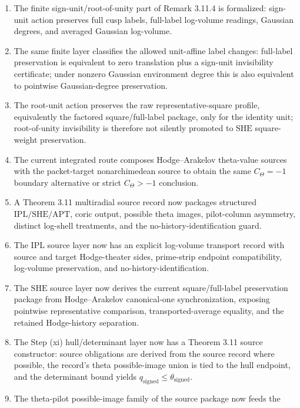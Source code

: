 \documentclass[11pt]{article}
\newcommand{\SHE}{\ensuremath{\mathrm{SHE}}}
\newcommand{\IPL}{\ensuremath{\mathrm{IPL}}}
\newcommand{\APT}{\ensuremath{\mathrm{APT}}}
\theoremstyle{plain}
\theoremstyle{definition}
\theoremstyle{remark}
\begin{document}
\begin{enumerate}
  calibration, the exact vertical-\(IQ\) target supplies the target alignment,
  and the finite-divisor packet source supplies the source alignment.
\item The finite sign-unit/root-of-unity part of Remark 3.11.4 is formalized:
  sign-unit action preserves full cusp labels, full-label log-volume readings,
  Gaussian degrees, and averaged Gaussian log-volume.
\item The same finite layer classifies the allowed unit-affine label changes:
  full-label preservation is equivalent to zero translation plus a sign-unit
  invisibility certificate; under nonzero Gaussian environment degree this is
  also equivalent to pointwise Gaussian-degree preservation.
\item The root-unit action preserves the raw representative-square profile,
  equivalently the factored square/full-label package, only for the identity
  unit; root-of-unity invisibility is therefore not silently promoted to
  \(\SHE\) square-weight preservation.
\item The current integrated route composes Hodge--Arakelov theta-value sources
  with the packet-target nonarchimedean source to obtain the same
  \(C_\Theta=-1\) boundary alternative or strict \(C_\Theta>-1\) conclusion.
\item A Theorem 3.11 multiradial source record now packages structured
  \(\IPL/\SHE/\APT\), coric output, possible theta images, pilot-column
  asymmetry, distinct log-shell treatments, and the no-history-identification
  guard.
\item The \(\IPL\) source layer now has an explicit log-volume transport record
  with source and target Hodge-theater sides, prime-strip endpoint
  compatibility, log-volume preservation, and no-history-identification.
\item The \(\SHE\) source layer now derives the current square/full-label
  preservation package from Hodge--Arakelov canonical-one synchronization,
  exposing pointwise representative comparison, transported-average equality,
  and the retained Hodge-history separation.
\item The Step (xi) hull/determinant layer now has a Theorem 3.11 source
  constructor: source obligations are derived from the source record where
  possible, the record's theta possible-image union is tied to the hull endpoint,
  and the determinant bound yields \(q_{\mathrm{signed}}\le\theta_{\mathrm{signed}}\).
\item The theta-pilot possible-image family of the source package now feeds the

\end{enumerate}
\end{document}
